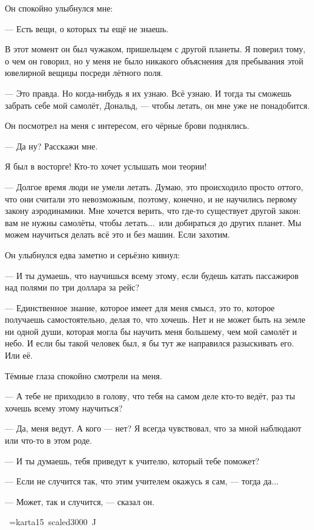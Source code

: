 Он спокойно улыбнулся мне:

--- Есть вещи, о которых ты ещё не знаешь.

В этот момент он был чужаком, пришельцем с другой планеты. Я поверил тому, о чем он говорил, но у меня не было никакого объяснения для пребывания этой ювелирной вещицы посреди лётного поля.

--- Это правда. Но когда-нибудь я их узнаю. Всё узнаю. И тогда ты сможешь забрать себе мой самолёт, Дональд, --- чтобы летать, он мне уже не понадобится.

Он посмотрел на меня с интересом, его чёрные брови поднялись.

--- Да ну? Расскажи мне.

Я был в восторге! Кто-то хочет услышать мои теории!

--- Долгое время люди не умели летать. Думаю, это происходило просто оттого, что они считали это
невозможным, поэтому, конечно, и не научились первому закону аэродинамики. Мне хочется верить,
что где-то существует другой закон: вам не нужны самолёты, чтобы летать...\ или добираться до
других планет. Мы можем научиться делать всё это и без машин. Если захотим.

Он улыбнулся едва заметно и серьёзно кивнул:

--- И ты думаешь, что научишься всему этому, если будешь катать пассажиров над полями по три доллара за рейс?

--- Единственное знание, которое имеет для меня смысл, это то, которое получаешь самостоятельно,
делая то, что хочешь. Нет и не может быть на земле ни одной души, которая могла бы научить меня
большему, чем мой самолёт и небо. И если бы такой человек был, я бы тут же направился разыскивать
его. Или её.

Тёмные глаза спокойно смотрели на меня.

--- А тебе не приходило в голову, что тебя на самом деле кто-то ведёт, раз ты хочешь всему этому научиться?

--- Да, меня ведут. А кого --- нет? Я всегда чувствовал, что за мной наблюдают или что-то в этом роде.

--- И ты думаешь, тебя приведут к учителю, который тебе поможет?

--- Если не случится так, что этим учителем окажусь я сам, --- тогда да...

--- Может, так и случится, --- сказал он.

\vskip28pt
\hbox{\kern7cm \font\karta=karta15 scaled3000 \karta ^^4a}
\vskip15pt

